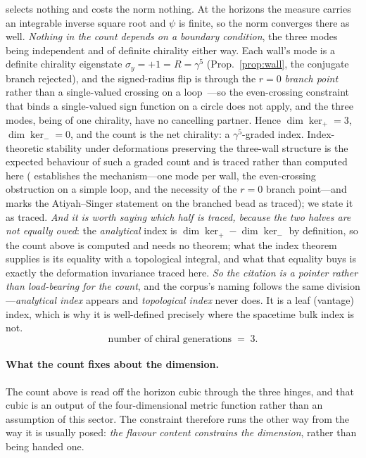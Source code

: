 \documentclass[11pt]{article}
\begin{document}
selects nothing and costs the norm nothing. At the horizons the measure carries an integrable inverse square root and $\psi$ is finite, so the norm converges there as well. \emph{Nothing in the count depends on a boundary condition}, the three modes being independent and of definite chirality either way. Each wall's mode is a definite chirality eigenstate $\sigma_y=+1=R=\gamma^5$ (Prop.~\ref{prop:wall}, the conjugate branch rejected), and the signed-radius flip is through the $r=0$ \emph{branch point} rather than a single-valued crossing on a loop~\cite{JanzenSlicing,JanzenCircle}---so the even-crossing constraint that binds a single-valued sign function on a circle does not apply, and the three modes, being of one chirality, have no cancelling partner. Hence $\dim\ker_+=3$, $\dim\ker_-=0$, and the count is the net chirality: a $\gamma^5$-graded index. Index-theoretic stability under deformations preserving the three-wall structure is the expected behaviour of such a graded count and is traced rather than computed here ( establishes the mechanism---one mode per wall, the even-crossing obstruction on a simple loop, and the necessity of the $r=0$ branch point---and marks the Atiyah--Singer statement on the branched bead as traced); we state it as traced. \emph{And it is worth saying which half is traced, because the two halves are not equally owed}: the \emph{analytical} index is $\dim\ker_+-\dim\ker_-$ by definition, so the count above is computed and needs no theorem; what the index theorem supplies is its equality with a topological integral, and what that equality buys is exactly the deformation invariance traced here. \emph{So the citation is a pointer rather than load-bearing for the count}, and the corpus's naming follows the same division---\emph{analytical index} appears and \emph{topological index} never does. It is a leaf (vantage) index, which is why it is well-defined precisely where the spacetime bulk index is not.
\begin{equation}
\boxed{\ \text{number of chiral generations} \;=\; 3.\ }
\end{equation}

\paragraph{What the count fixes about the dimension.} The count above is read off the horizon
cubic through the three hinges, and that cubic is an output of the four-dimensional metric function
rather than an assumption of this sector. The constraint therefore runs the other way from the way
it is usually posed: \emph{the flavour content constrains the dimension}, rather than being handed
one.
\end{document}
